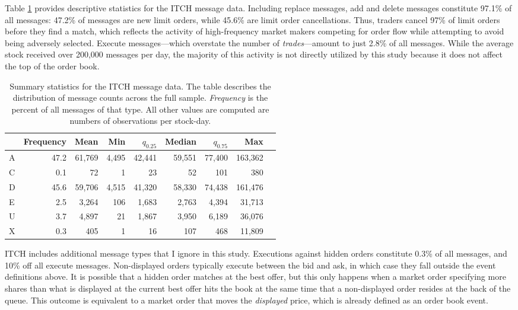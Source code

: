 	Table \ref{tab:message_counts} provides descriptive statistics for the ITCH message data. Including replace messages, add and delete messages constitute 97.1\% of all messages: 47.2\% of messages are new limit orders, while 45.6\% are limit order cancellations. Thus, traders cancel 97\% of limit orders before they find a match, which reflects the activity of high-frequency market makers competing for order flow while attempting to avoid being adversely selected. Execute messages---which overstate the number of \textit{trades}---amount to just 2.8\% of all messages. While the average stock received over 200,000 messages per day, the majority of this activity is not directly utilized by this study because it does not affect the top of the order book.

	\begin{table}[t]
		\small
		\linespread{1}
		\centering
		\begin{tabular*}{\textwidth}{@{\extracolsep{\fill}}lrrrrrrrr}
			\toprule{}
			 &  Frequency  &   Mean  & Min &  $q_{0.25}$ &  Median &    $q_{0.75}$   &        Max \\
			\midrule
			A &  47.2  &  61,769 &  4,495 &  42,441 &  59,551 &  77,400 &  163,362 \\
			C &  0.1   &      72 &     1  &      23 &      52 &     101 &      380 \\
			D &  45.6  &  59,706 &  4,515 &  41,320 &  58,330 &  74,438 &  161,476 \\
			E &  2.5   &   3,264 &   106  &   1,683 &   2,763 &   4,394 &   31,713 \\
			U &  3.7   &   4,897 &     21 &   1,867 &   3,950 &   6,189 &   36,076 \\
			X &  0.3   &     405 &      1 &      16 &     107 &     468 &   11,809 \\
			\bottomrule
		\end{tabular*}
		\captionsetup{position=below, font=footnotesize, justification=justified, width=\linewidth}
		\caption[Summary statistics for the ITCH message data]{Summary statistics for the ITCH message data. The table describes the distribution of message counts across the full sample. \textit{Frequency} is the percent of all messages of that type. All other values are computed are numbers of observations per stock-day.}
		\label{tab:message_counts}
	\end{table}

	ITCH includes additional message types that I ignore in this study. Executions against hidden orders constitute 0.3\% of all messages, and 10\% off all execute messages. Non-displayed orders typically execute between the bid and ask, in which case they fall outside the event definitions above. It is possible that a hidden order matches at the best offer, but this only happens when a market order specifying more shares than what is displayed at the current best offer hits the book at the same time that a non-displayed order resides at the back of the queue. This outcome is equivalent to a market order that moves the \textit{displayed} price, which is already defined as an order book event.

